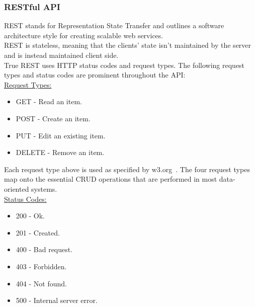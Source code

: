\documentclass[preprint,12pt,3p]{elsarticle}
\begin{document}
\subsubsection{RESTful API}

REST stands for Representation State Transfer and outlines a software architecture style for creating scalable web services.\\
REST is stateless, meaning that the clients' state isn't maintained by the server and is instead maintained client side.\\
True REST uses HTTP status codes and request types. The following request types and status codes are prominent throughout the API:\\

\underline{Request Types:}
\begin{itemize}
\item GET - Read an item.
\item POST - Create an item.
\item PUT - Edit an existing item.
\item DELETE - Remove an item.
\end{itemize}

Each request type above is used as specified by w3.org~\cite{w3}. The four request types map onto the essential CRUD operations that are performed in most data-oriented systems.\\

\underline{Status Codes:}
\begin{itemize}
\item 200 - Ok.
\item 201 - Created.
\item 400 - Bad request.
\item 403 - Forbidden.
\item 404 - Not found.
\item 500 - Internal server error.
\end{itemize}
\end{document}
